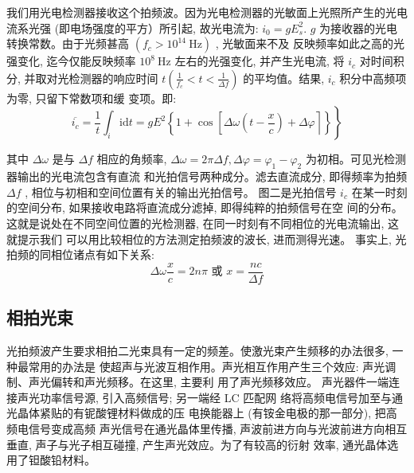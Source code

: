 \documentclass{buaaemp}
\begin{document}
我们用光电检测器接收这个拍频波。因为光电检测器的光敏面上光照所产生的光电流系光强 (即电场强度的平方）所引起, 故光电流为: $i_0=gE_s^2$.
 $g$  为接收器的光电转换常数。由于光频甚高 $ \left(f_{c}>10^{14} \mathrm{~Hz}\right)$ , 光敏面来不及 反映频率如此之高的光强变化, 迄今仅能反映频率  $10^{8} \mathrm{~Hz}$  左右的光强变化, 并产生光电流, 将 $ i_{c} $ 对时间积 分, 并取对光检测器的响应时间  $t\left(\frac{1}{f_{c}}<t<\frac{1}{\Delta f}\right)$  的平均值。结果,  $i_{c} $ 积分中高频项为零, 只留下常数项和缓 变项。即:
\begin{equation*}
    \left.\overline{i_{c}}=\frac{1}{t} \int_{i} \mathrm{id} t=g E^{2}\left\{1+\cos \left[\Delta \omega\left(t-\frac{x}{c}\right)+\Delta \varphi\right\rceil\right\}\right\}
\end{equation*}

其中 $ \Delta \omega$  是与  $\Delta f$  相应的角频率,  $\Delta \omega=2 \pi \Delta f, \Delta \varphi=\varphi_{1}-\varphi_{2} $ 为初相。可见光检测器输出的光电流包含有直流 和光拍信号两种成分。滤去直流成分, 即得频率为拍频 $ \Delta f$ , 相位与初相和空间位置有关的输出光拍信号。
图二是光拍信号 $ i_{c}$  在某一时刻的空间分布, 如果接收电路将直流成分滤掉, 即得纯粹的拍频信号在空 间的分布。这就是说处在不同空间位置的光检测器, 在同一时刻有不同相位的光电流输出, 这就提示我们 可以用比较相位的方法测定拍频波的波长, 进而测得光速。
事实上, 光拍频的同相位诸点有如下关系:\cite{钱建强2016近代物理实验}
\begin{equation}
    \Delta \omega \frac{x}{c}=2 n \pi \text { 或 } x=\frac{n c}{\Delta f}
\end{equation}

\subsection{相拍光束}
光拍频波产生要求相拍二光束具有一定的频差。使激光束产生频移的办法很多, 一种最常用的办法是 使超声与光波互相作用。声光相互作用产生三个效应: 声光调制、声光偏转和声光频移。在这里, 主要利 用了声光频移效应。
声光器件一端连接声光功率信号源, 引入高频信号; 另一端经 LC 匹配网 络将高频电信号加至与通光晶体紧贴的有铌酸锂材料做成的压 电换能器上 (有铵金电极的那一部分), 把高频电信号变成高频 声光信号在通光晶体里传播, 声波前进方向与光波前进方向相互 垂直, 声子与光子相互碰撞, 产生声光效应。为了有较高的衍射 效率, 通光晶体选用了钽酸铅材料。\cite{安毓英2003光电子技术}
\end{document}
